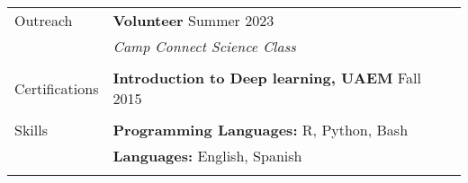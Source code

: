 \documentclass[letterpaper, 11pt]{article}
\begin{document}
\begin{longtable}{p{1.1in}p{6.05in}}
{\sc Outreach}
& \textbf{Volunteer} \hfill Summer 2023 \\
& \textit{Camp Connect Science Class} \\
& \\

{\sc Certifications}
& \textbf{Introduction to Deep learning, UAEM} \hfill  Fall 2015 \\
& \\

{\sc Skills}
& \textbf{Programming Languages:} R, Python, Bash \\

& \textbf{Languages:}  English, Spanish\\
&\\






\end{longtable}
\end{document}
